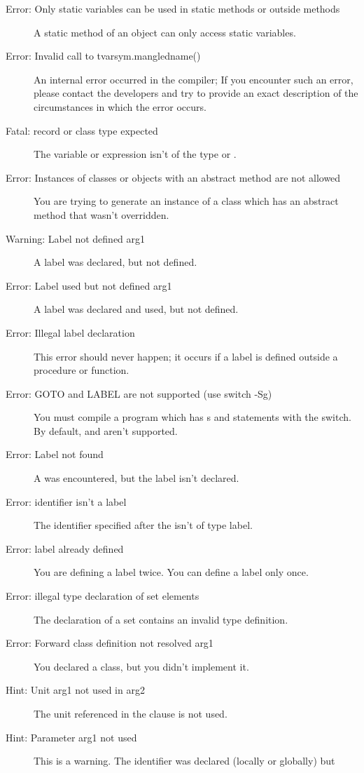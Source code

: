 \begin{description}
\item [Error: Only static variables can be used in static methods or outside methods]
 A static method of an object can only access static variables.
\item [Error: Invalid call to tvarsym.mangledname()]
 An internal error occurred in the compiler; If you encounter such an error,
 please contact the developers and try to provide  an exact description of
 the circumstances in which the error occurs.
\item [Fatal: record or class type expected]
 The variable or expression isn't of the type  or .
\item [Error: Instances of classes or objects with an abstract method are not allowed]
 You are trying to generate an instance of a class which has an abstract
 method that wasn't overridden.
\item [Warning: Label not defined arg1]
 A label was declared, but not defined.
\item [Error: Label used but not defined arg1]
 A label was declared and used, but not defined.
\item [Error: Illegal label declaration]
 This error should never happen; it occurs if a label is defined outside a
 procedure or function.
\item [Error: GOTO and LABEL are not supported (use switch -Sg)]
 You must compile a program which has s and  statements
 with the   switch. By default,  and  aren't
 supported.
\item [Error: Label not found]
 A  was encountered, but the label isn't declared.
\item [Error: identifier isn't a label]
 The identifier specified after the  isn't of type label.
\item [Error: label already defined]
 You are defining a label twice. You can define a label only once.
\item [Error: illegal type declaration of set elements]
 The declaration of a set contains an invalid type definition.
\item [Error: Forward class definition not resolved arg1]
 You declared a class, but you didn't implement it.
\item [Hint: Unit arg1 not used in arg2]
 The unit referenced in the  clause is not used.
\item [Hint: Parameter arg1 not used]
 This is a warning. The identifier was declared (locally or globally) but

\end{description}
